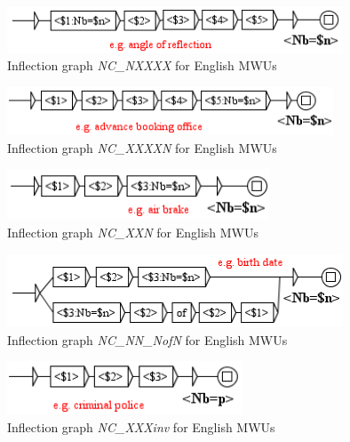 \begin{figure}[!htb]
  \centering
  \includegraphics[width=10cm]{resources/img/NC'NXXXX'EN.png}
  \caption{Inflection graph \emph{NC\_NXXXX} for English MWUs}
  \label{fig:NC'NXXXX'EN}
\end{figure}

\begin{figure}[!htb]
  \centering
  \includegraphics[width=9.7cm]{resources/img/NC'XXXXN'EN.png}
  \caption{Inflection graph \emph{NC\_XXXXN} for English MWUs}
  \label{fig:NC'XXXXN'EN}
\end{figure}

\begin{figure}[!htb]
  \centering
  \includegraphics[width=7.8cm]{resources/img/NC'XXN'EN.png}
  \caption{Inflection graph \emph{NC\_XXN} for English MWUs}
  \label{fig:NC'XXN}
\end{figure}

\begin{figure}[!htb]
  \centering
  \includegraphics[width=10cm]{resources/img/NC'NN'NofN'EN.png}
  \caption{Inflection graph \emph{NC\_NN\_NofN} for English MWUs}
  \label{fig:NC'NN'NofN'EN}
\end{figure}

\begin{figure}[!htb]
  \centering
  \includegraphics[width=7cm]{resources/img/NC'XXXinv'EN.png}
  \caption{Inflection graph \emph{NC\_XXXinv} for English MWUs}
  \label{fig:NC'XXXinv'EN}
\end{figure}

